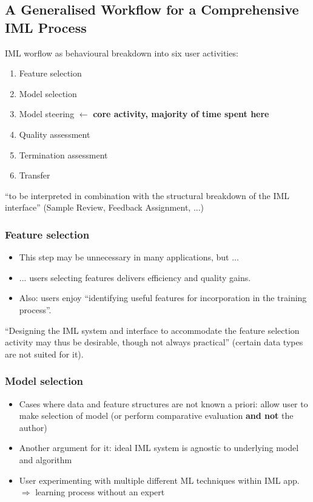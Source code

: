 \documentclass[12pt,a4paper]{article}
\begin{document}
\subsection{A Generalised Workflow for a Comprehensive IML Process}
IML worflow as behavioural breakdown into six user activities:
\begin{enumerate}
\item Feature selection
\item Model selection
\item Model steering $\leftarrow$ \textbf{core activity, majority of time spent here}
\item Quality assessment
\item Termination assessment
\item Transfer
\end{enumerate}
\begin{description}
\item ``to be interpreted in combination with the structural breakdown of the IML interface'' (Sample Review, Feedback Assignment, ...)
\end{description}
\subsubsection{Feature selection}
\begin{itemize}
\item This step may be unnecessary in many applications, but ...
\item ... users selecting features delivers efficiency and quality gains.
\item Also: users enjoy ``identifying useful features for incorporation in the training process''.
\end{itemize}
\begin{description}
\item ``Designing the IML system and interface to accommodate the feature selection activity may thus be desirable, though not always practical'' (certain data types are not suited for it).
\end{description}
\subsubsection{Model selection}
\begin{itemize}
\item Cases where data and feature structures are not known a priori: allow user to make selection of model (or perform comparative evaluation \textbf{and not} the author)
\item Another argument for it: ideal IML system is agnostic to underlying model and algorithm
\item User experimenting with multiple different ML techniques within IML app. $\Rightarrow$ learning process without an expert
\end{itemize}
\end{document}
